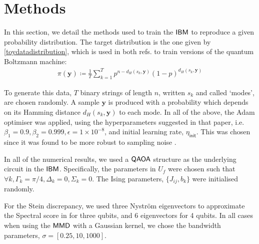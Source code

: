 \section*{Methods}\label{sec:methods}
In this section, we detail the methods used to train the $\textsf{IBM}$ to reproduce a given probability distribution. The target distribution is the one given by \eqref{toydatadistribution}, which is used in both refs.\cite{amin_quantum_2018, verdon_quantum_2017} to train versions of the quantum Boltzmann machine:
\begin{align}
    \pi(\mathbf{y}) \coloneqq \frac{1}{T}\sum\limits_{k=1}^T 
    p^{n - d_H(s_k, \mathbf{y})}
    (1-p)^{d_H(s_k, \mathbf{y})}
\label{toydatadistribution}
\end{align}

\noindent To generate this data, $T$ %
binary strings of length $n$, written $s_k$ and called `modes',  
are chosen randomly. 
A sample $\mathbf{y}$ is produced with a probability which depends on its Hamming distance $d_H(s_k, \mathbf{y})$ to each mode. In all of the above, the Adam \cite{kingma_adam:_2014} optimiser was applied, using the hyperparameters suggested in that paper, i.e.\@ $\beta_1 = 0.9, \beta_2 = 0.999, \epsilon = 1\times 10^{-8}$, and initial learning rate, $\eta_{\mathsf{init}}$. This was chosen since it was found to be more robust to sampling noise \cite{liu_differentiable_2018}.

In all of the numerical results, we used a $\operatorname{\textsf{QAOA}}$ structure as the underlying circuit in the $\textsf{IBM}$. Specifically, the parameters in $U_f$ were chosen such that $\forall k, \Gamma_k = \pi/4, \Delta_k = 0, \Sigma_k = 0$. The Ising parameters, $\{J_{ij}, b_k\}$ were initialised randomly. 

For the Stein discrepancy, we used three Nystr\"{o}m eigenvectors to approximate the Spectral score in  for three qubits, and 6 eigenvectors for 4 qubits. In all cases when using the $\operatorname{\textsf{MMD}}$ with a Gaussian kernel, we chose the bandwidth parameters, $\sigma = [0.25, 10, 1000]$\cite{liu_differentiable_2018}.

